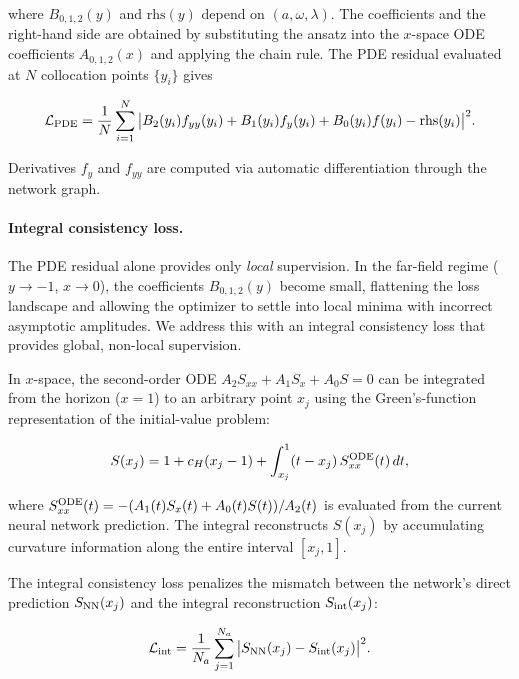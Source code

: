 \documentclass[aps,prd,twocolumn,superscriptaddress,nofootinbib]{revtex4-2}
\begin{document}
where $B_{0,1,2}(y)$ and $\mathrm{rhs}(y)$ depend on $(a, \omega, \lambda)$.
The coefficients and the right-hand side are obtained by substituting the ansatz
into the $x$-space ODE coefficients $A_{0,1,2}(x)$ and applying the chain rule.
The PDE residual evaluated at $N$ collocation points $\{y_i\}$ gives

\begin{equation}
  \mathcal{L}_{\rm PDE} = \frac{1}{N}\sum_{i=1}^{N}
    \big| B_2(y_i) f_{yy}(y_i) + B_1(y_i) f_y(y_i)
    + B_0(y_i) f(y_i) - \mathrm{rhs}(y_i) \big|^2.
\end{equation}

Derivatives $f_y$ and $f_{yy}$ are computed via automatic differentiation
through the network graph.

\paragraph{Integral consistency loss.}  The PDE residual alone provides only
\emph{local} supervision.  In the far-field regime ($y \to -1$, $x \to 0$),
the coefficients $B_{0,1,2}(y)$ become small, flattening the loss landscape and
allowing the optimizer to settle into local minima with incorrect asymptotic
amplitudes.  We address this with an integral consistency loss that provides
global, non-local supervision.

In $x$-space, the second-order ODE $A_2 S_{xx} + A_1 S_x + A_0 S = 0$ can be
integrated from the horizon ($x=1$) to an arbitrary point $x_j$ using the
Green's-function representation of the initial-value problem:

\begin{equation}\label{eq:integral_form}
  S(x_j) = 1 + c_H (x_j - 1)
    + \int_{x_j}^{1} (t - x_j)\, S_{xx}^{\rm ODE}(t)\, dt,
\end{equation}

where $S_{xx}^{\rm ODE}(t) = -(A_1(t) S_x(t) + A_0(t) S(t)) / A_2(t)$ is
evaluated from the current neural network prediction.  The integral
reconstructs $S(x_j)$ by accumulating curvature information along the entire
interval $[x_j, 1]$.

The integral consistency loss penalizes the mismatch between the network's
direct prediction $S_{\rm NN}(x_j)$ and the integral reconstruction
$S_{\rm int}(x_j)$:

\begin{equation}
  \mathcal{L}_{\rm int} = \frac{1}{N_a}\sum_{j=1}^{N_a}
    \big| S_{\rm NN}(x_j) - S_{\rm int}(x_j) \big|^2.
\end{equation}
\end{document}
